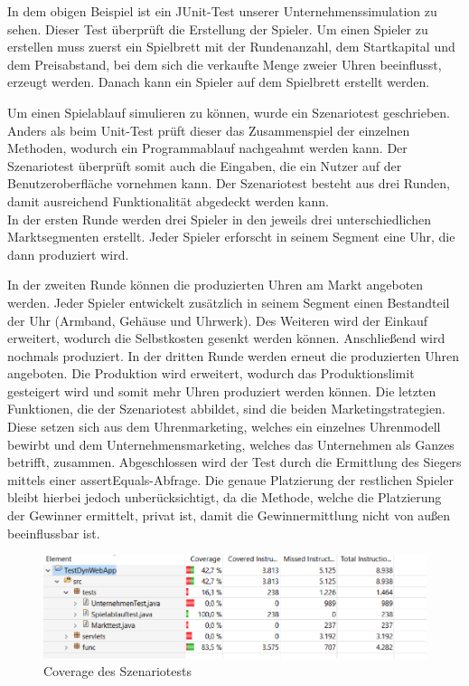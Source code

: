 In dem obigen Beispiel ist ein JUnit-Test unserer Unternehmenssimulation zu sehen. Dieser Test überprüft die Erstellung der Spieler. Um einen Spieler zu erstellen muss zuerst ein Spielbrett mit der Rundenanzahl, dem Startkapital und dem Preisabstand, bei dem sich die verkaufte Menge zweier Uhren beeinflusst, erzeugt werden. Danach kann ein Spieler auf dem Spielbrett erstellt werden. 

Um einen Spielablauf simulieren zu können, wurde ein Szenariotest geschrieben. Anders als beim Unit-Test prüft dieser das Zusammenspiel der einzelnen Methoden, wodurch ein Programmablauf nachgeahmt werden kann. Der Szenariotest überprüft somit auch die Eingaben, die ein Nutzer auf der Benutzeroberfläche vornehmen kann.
Der Szenariotest besteht aus drei Runden, damit ausreichend Funktionalität abgedeckt werden kann. 
\\
In der ersten Runde werden drei Spieler in den jeweils drei unterschiedlichen Marktsegmenten erstellt. Jeder Spieler erforscht in seinem Segment eine Uhr, die dann produziert wird. \par
In der zweiten Runde können die produzierten Uhren am Markt angeboten werden. Jeder Spieler entwickelt zusätzlich in seinem Segment einen Bestandteil der Uhr (Armband, Gehäuse und Uhrwerk). Des Weiteren wird der Einkauf erweitert, wodurch die Selbstkosten gesenkt werden können. Anschließend wird nochmals produziert. 
In der dritten Runde werden erneut die produzierten Uhren angeboten. Die Produktion wird erweitert, wodurch das Produktionslimit gesteigert wird und somit mehr Uhren produziert werden können. Die letzten Funktionen, die der Szenariotest abbildet, sind die beiden Marketingstrategien. Diese setzen sich aus dem Uhrenmarketing, welches ein einzelnes Uhrenmodell bewirbt und dem Unternehmensmarketing, welches das Unternehmen als Ganzes betrifft, zusammen. 
Abgeschlossen wird der Test durch die Ermittlung des Siegers mittels einer assertEquals-Abfrage. Die genaue Platzierung der restlichen Spieler bleibt hierbei jedoch unberücksichtigt, da die Methode, welche die Platzierung der Gewinner ermittelt, privat ist, damit die Gewinnermittlung nicht von außen beeinflussbar ist. 

\begin{figure}[!h]
	\centering
	\includegraphics[scale=0.8]{img/bild1_tests.png} 
	\caption{Coverage des Szenariotests} \label{fig:abb31}
\end{figure}

